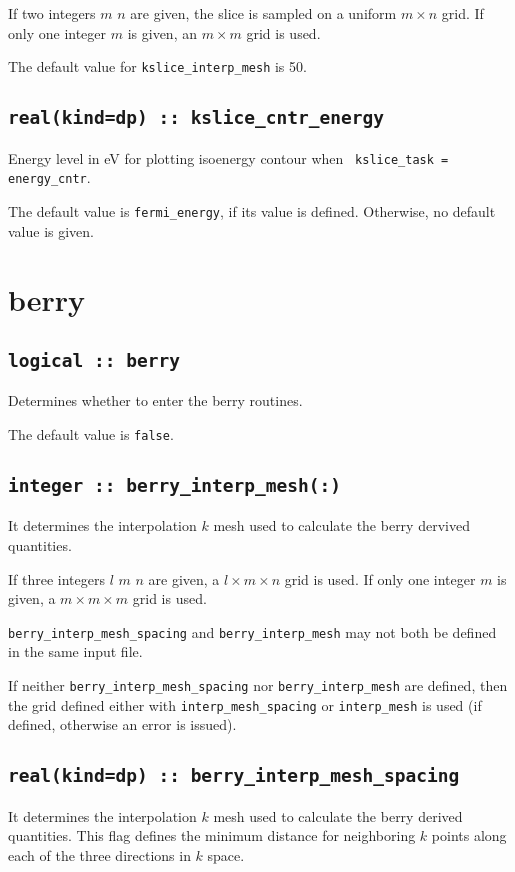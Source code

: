If two integers $m$ $n$ are given, the slice is sampled on a uniform
$m\times n$ grid.  If only one integer $m$ is given, an $m\times m$
grid is used.

The default value for \verb#kslice_interp_mesh# is 50.


\subsection[kslice\_cntr\_energy]{\tt real(kind=dp) :: kslice\_cntr\_energy}

Energy level in eV for plotting isoenergy contour when {\tt
  kslice\_task = energy\_cntr}.

The default value is {\tt fermi\_energy}, if its value is
defined. Otherwise, no default value is given.

\clearpage
\section{berry}

\subsection[berry]{\tt logical :: berry}
Determines whether to enter the berry routines.

The default value is \verb#false#.

\subsection[berry\_interp\_mesh]{\tt integer :: berry\_interp\_mesh(:)}
It determines the interpolation $k$ mesh used to calculate the berry
dervived quantities.

If three integers $l$ $m$ $n$ are given, a $l\times m\times n$ grid is used. If only one integer $m$ is given, a $m\times m\times m$ grid is used.

{\tt berry\_interp\_mesh\_spacing} and  {\tt berry\_interp\_mesh} may not both be defined in the same input file.

If neither {\tt berry\_interp\_mesh\_spacing} nor  {\tt berry\_interp\_mesh} are defined, then the grid defined either with {\tt interp\_mesh\_spacing} or {\tt interp\_mesh} is used (if defined, otherwise an error is issued).

\subsection[berry\_interp\_mesh\_spacing]{\tt real(kind=dp) :: berry\_interp\_mesh\_spacing}
It determines the interpolation $k$ mesh used to calculate the berry
derived quantities. This flag
defines the minimum distance for neighboring $k$ points along each of
the three directions in $k$ space. 


